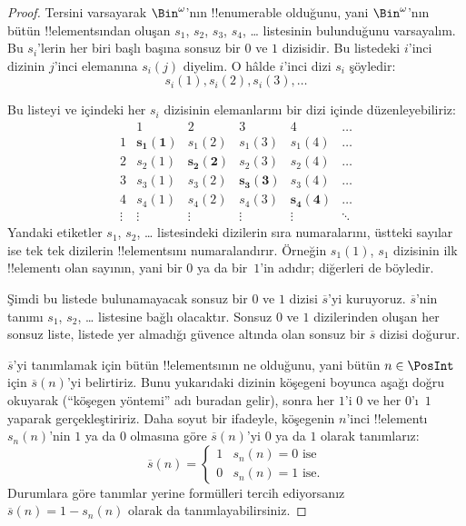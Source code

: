 \begin{proof}
Tersini varsayarak $\Bin^\omega$'nın !!{enumerable} olduğunu, yani
$\Bin^\omega$'nın bütün !!{element}s{}ından oluşan $s_1$, $s_2$, $s_3$,
$s_4$, \dots{} listesinin bulunduğunu varsayalım. Bu $s_i$'lerin her biri
başlı başına sonsuz bir $0$ ve $1$ dizisidir. Bu listedeki $i$'inci dizinin
$j$'inci elemanına $s_i(j)$ diyelim. O hâlde $i$'inci dizi $s_i$ şöyledir:
\[
s_i(1), s_i(2), s_i(3), \dots
\]

Bu listeyi ve içindeki her $s_i$ dizisinin elemanlarını bir dizi içinde
düzenleyebiliriz:
\[
\begin{array}{c|c|c|c|c|c}
& 1 & 2 & 3 & 4 & \dots \\\hline
1 & \mathbf{s_{1}(1)} & s_{1}(2) & s_{1}(3) & s_1(4) & \dots \\\hline
2 & s_{2}(1)& \mathbf{s_{2}(2)} & s_2(3) & s_2(4) & \dots \\\hline
3 & s_{3}(1)& s_{3}(2) & \mathbf{s_3(3)} & s_3(4) & \dots \\\hline
4 & s_{4}(1)& s_{4}(2) & s_4(3) & \mathbf{s_4(4)} & \dots \\\hline
\vdots & \vdots & \vdots & \vdots & \vdots & \mathbf{\ddots}
\end{array}
\]
Yandaki etiketler $s_1$, $s_2$, \dots{} listesindeki dizilerin sıra numaralarını,
üstteki sayılar ise tek tek dizilerin !!{element}s{}ını numaralandırır.
Örneğin $s_1(1)$, $s_1$ dizisinin ilk !!{element}{}ı olan sayının, yani bir
$0$ ya da bir~$1$'in adıdır; diğerleri de böyledir.

Şimdi bu listede bulunamayacak sonsuz bir $0$ ve $1$ dizisi
$\overline{s}$'yi kuruyoruz. $\overline{s}$'nin tanımı $s_1$, $s_2$,
\dots{} listesine bağlı olacaktır. Sonsuz $0$ ve $1$ dizilerinden oluşan her
sonsuz liste, listede yer almadığı güvence altında olan sonsuz bir
$\overline{s}$ dizisi doğurur.

$\overline{s}$'yi tanımlamak için bütün !!{element}s{}ının ne olduğunu, yani
bütün $n\in\PosInt$ için $\overline{s}(n)$'yi belirtiriz. Bunu yukarıdaki
dizinin köşegeni boyunca aşağı doğru okuyarak (``köşegen yöntemi'' adı buradan
gelir), sonra her $1$'i $0$ ve her $0$'ı~$1$ yaparak gerçekleştiririz. Daha
soyut bir ifadeyle, köşegenin $n$'inci !!{element}{}ı $s_n(n)$'nin $1$ ya da
$0$ olmasına göre $\overline{s}(n)$'yi $0$ ya da $1$ olarak tanımlarız:
\[
\overline{s}(n) =
\begin{cases}
1 & \text{$s_{n}(n) = 0$ ise}\\
0 & \text{$s_{n}(n) = 1$ ise.}
\end{cases}
\]
Durumlara göre tanımlar yerine formülleri tercih ediyorsanız
$\overline{s}(n)=1-s_n(n)$ olarak da tanımlayabilirsiniz.


\end{proof}

